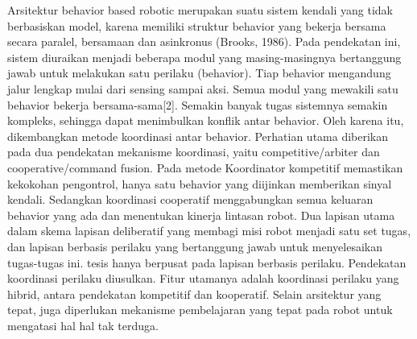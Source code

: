 Arsitektur behavior based robotic merupakan suatu sistem kendali yang tidak berbasiskan model, karena memiliki struktur behavior yang bekerja bersama secara paralel, bersamaan dan asinkronus (Brooks, 1986).  Pada pendekatan ini, sistem diuraikan menjadi beberapa modul yang masing-masingnya bertanggung jawab untuk melakukan satu perilaku (behavior). Tiap behavior mengandung jalur lengkap mulai dari sensing sampai aksi. Semua modul yang mewakili satu behavior bekerja bersama-sama[2]. Semakin banyak tugas sistemnya semakin kompleks, sehingga dapat menimbulkan konflik antar behavior. Oleh karena itu, dikembangkan metode koordinasi antar behavior. Perhatian utama diberikan pada dua pendekatan mekanisme koordinasi, yaitu competitive/arbiter dan cooperative/command fusion. Pada metode Koordinator kompetitif memastikan kekokohan pengontrol, hanya satu behavior yang diijinkan memberikan sinyal kendali. Sedangkan koordinasi cooperatif  menggabungkan semua keluaran behavior yang ada dan menentukan kinerja lintasan robot. Dua lapisan utama dalam skema lapisan deliberatif yang membagi misi robot menjadi satu set tugas, dan lapisan berbasis perilaku yang bertanggung jawab untuk menyelesaikan tugas-tugas ini. tesis hanya berpusat pada lapisan berbasis perilaku. Pendekatan koordinasi perilaku diusulkan. Fitur utamanya adalah koordinasi perilaku yang hibrid, antara pendekatan kompetitif dan kooperatif. Selain arsitektur yang tepat, juga diperlukan mekanisme pembelajaran yang tepat pada robot untuk mengatasi hal hal tak terduga.

